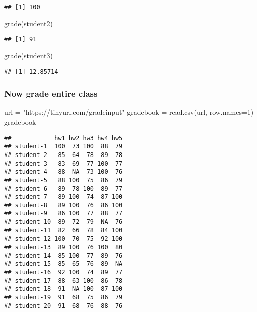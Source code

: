 \documentclass[
]{article}
\newenvironment{Shaded}{\begin{snugshade}}{\end{snugshade}}
\newcommand{\AttributeTok}[1]{\textcolor[rgb]{0.77,0.63,0.00}{#1}}
\newcommand{\DecValTok}[1]{\textcolor[rgb]{0.00,0.00,0.81}{#1}}
\newcommand{\FunctionTok}[1]{\textcolor[rgb]{0.00,0.00,0.00}{#1}}
\newcommand{\NormalTok}[1]{#1}
\newcommand{\OtherTok}[1]{\textcolor[rgb]{0.56,0.35,0.01}{#1}}
\newcommand{\StringTok}[1]{\textcolor[rgb]{0.31,0.60,0.02}{#1}}
\begin{document}
\begin{verbatim}
## [1] 100
\end{verbatim}

\begin{Shaded}
\begin{Highlighting}[]
\FunctionTok{grade}\NormalTok{(student2)}
\end{Highlighting}
\end{Shaded}

\begin{verbatim}
## [1] 91
\end{verbatim}

\begin{Shaded}
\begin{Highlighting}[]
\FunctionTok{grade}\NormalTok{(student3)}
\end{Highlighting}
\end{Shaded}

\begin{verbatim}
## [1] 12.85714
\end{verbatim}

\hypertarget{now-grade-entire-class}{%
\subsubsection{Now grade entire class}\label{now-grade-entire-class}}

\begin{Shaded}
\begin{Highlighting}[]
\NormalTok{url }\OtherTok{=} \StringTok{"https://tinyurl.com/gradeinput"}
\NormalTok{gradebook }\OtherTok{=} \FunctionTok{read.csv}\NormalTok{(url, }\AttributeTok{row.names=}\DecValTok{1}\NormalTok{)}
\NormalTok{gradebook}
\end{Highlighting}
\end{Shaded}

\begin{verbatim}
##            hw1 hw2 hw3 hw4 hw5
## student-1  100  73 100  88  79
## student-2   85  64  78  89  78
## student-3   83  69  77 100  77
## student-4   88  NA  73 100  76
## student-5   88 100  75  86  79
## student-6   89  78 100  89  77
## student-7   89 100  74  87 100
## student-8   89 100  76  86 100
## student-9   86 100  77  88  77
## student-10  89  72  79  NA  76
## student-11  82  66  78  84 100
## student-12 100  70  75  92 100
## student-13  89 100  76 100  80
## student-14  85 100  77  89  76
## student-15  85  65  76  89  NA
## student-16  92 100  74  89  77
## student-17  88  63 100  86  78
## student-18  91  NA 100  87 100
## student-19  91  68  75  86  79
## student-20  91  68  76  88  76
\end{verbatim}
\end{document}
